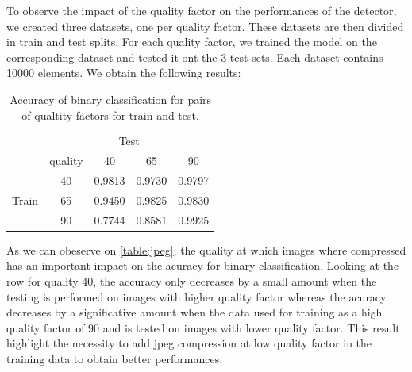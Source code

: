 \documentclass[12pt,a4paper]{article}
\begin{document}
To observe the impact of the quality factor on the performances of the detector, we created three datasets, one per quality factor. These datasets are then divided in train and test splits. For each quality factor, we trained the model on the corresponding dataset and tested it ont the 3 test sets. Each dataset contains 10000 elements. We obtain the following results:
\begin{table}[H]
    \centering
    \begin{tabular}{|c|c|c|c|c|}
    \hline
    & \multicolumn{4}{c|}{Test} \\
    \cline{2-5}
     & quality & 40 & 65 & 90 \\
    \hline
    \multirow{3}{*}{Train} & 40 & 0.9813 & 0.9730 & 0.9797 \\
     \cline{2-5}
     & 65 & 0.9450 & 0.9825 & 0.9830 \\
     \cline{2-5}
     & 90 & 0.7744 & 0.8581 & 0.9925 \\
    \hline
    \end{tabular}
    \caption{Accuracy of binary classification for pairs of qualtity factors for train and test.}
    \label{table:jpeg}
\end{table}

As we can obeserve on \autoref*{table:jpeg}, the quality at which images where compressed has an important impact on the acuracy for binary classification. Looking at the row for quality 40, the accuracy only decreases by a small amount when the testing is performed on images with higher quality factor whereas the acuracy decreases by a significative amount when the data used for training as a high quality factor of 90 and is tested on images with lower quality factor. This result highlight the necessity to add jpeg compression at low quality factor in the training data to obtain better performances.
\end{document}
